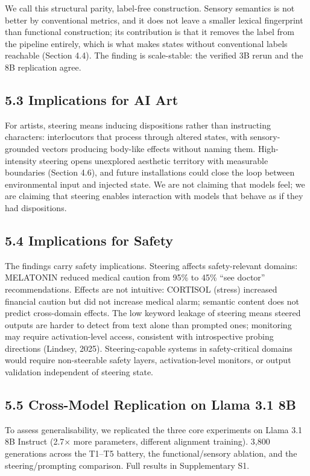 \documentclass[11pt,a4paper]{article}
\begin{document}
We call this structural parity, label-free construction. Sensory semantics is not better by conventional metrics, and it does not leave a smaller lexical fingerprint than functional construction; its contribution is that it removes the label from the pipeline entirely, which is what makes states without conventional labels reachable (Section 4.4). The finding is scale-stable: the verified 3B rerun and the 8B replication agree.

\subsection*{5.3 Implications for AI Art}

For artists, steering means inducing dispositions rather than instructing characters: interlocutors that process through altered states, with sensory-grounded vectors producing body-like effects without naming them. High-intensity steering opens unexplored aesthetic territory with measurable boundaries (Section 4.6), and future installations could close the loop between environmental input and injected state. We are not claiming that models feel; we are claiming that steering enables interaction with models that behave as if they had dispositions.

\subsection*{5.4 Implications for Safety}

The findings carry safety implications. Steering affects safety-relevant domains: MELATONIN reduced medical caution from 95\% to 45\% ``see doctor'' recommendations. Effects are not intuitive: CORTISOL (stress) increased financial caution but did not increase medical alarm; semantic content does not predict cross-domain effects. The low keyword leakage of steering means steered outputs are harder to detect from text alone than prompted ones; monitoring may require activation-level access, consistent with introspective probing directions (Lindsey, 2025). Steering-capable systems in safety-critical domains would require non-steerable safety layers, activation-level monitors, or output validation independent of steering state.

\subsection*{5.5 Cross-Model Replication on Llama 3.1 8B}

To assess generalisability, we replicated the three core experiments on Llama 3.1 8B Instruct (2.7× more parameters, different alignment training). 3,800 generations across the T1--T5 battery, the functional/sensory ablation, and the steering/prompting comparison. Full results in Supplementary S1.
\end{document}
